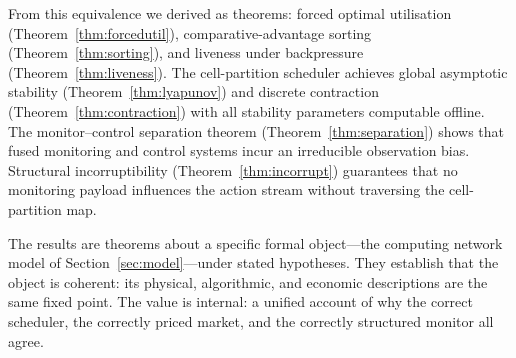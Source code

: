 \documentclass[11pt,twocolumn,a4paper]{article}
\theoremstyle{plain}
\theoremstyle{definition}
\theoremstyle{remark}
\begin{document}
From this equivalence we derived as theorems: forced optimal utilisation (Theorem~\ref{thm:forcedutil}), comparative-advantage sorting (Theorem~\ref{thm:sorting}), and liveness under backpressure (Theorem~\ref{thm:liveness}). The cell-partition scheduler achieves global asymptotic stability (Theorem~\ref{thm:lyapunov}) and discrete contraction (Theorem~\ref{thm:contraction}) with all stability parameters computable offline. The monitor--control separation theorem (Theorem~\ref{thm:separation}) shows that fused monitoring and control systems incur an irreducible observation bias. Structural incorruptibility (Theorem~\ref{thm:incorrupt}) guarantees that no monitoring payload influences the action stream without traversing the cell-partition map.

The results are theorems about a specific formal object---the computing network model of Section~\ref{sec:model}---under stated hypotheses. They establish that the object is coherent: its physical, algorithmic, and economic descriptions are the same fixed point. The value is internal: a unified account of why the correct scheduler, the correctly priced market, and the correctly structured monitor all agree.



\end{document}
